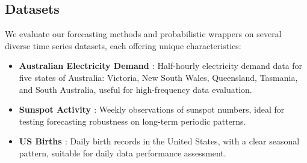 \subsection{Datasets} \label{datasets}
We evaluate our forecasting methods and probabilistic wrappers on several diverse time series datasets, each offering unique characteristics:

\begin{itemize}
    \item \textbf{Australian Electricity Demand \cite{Godahewa2021Australian}}: Half-hourly electricity demand data for five states of Australia: Victoria, New South Wales, Queensland, Tasmania, and South Australia, useful for high-frequency data evaluation.
    \item \textbf{Sunspot Activity \cite{Godahewa2021Sunspot}}: Weekly observations of sunspot numbers, ideal for testing forecasting robustness on long-term periodic patterns.
    \item \textbf{US Births \cite{Godahewa2021USBirth}}: Daily birth records in the United States, with a clear seasonal pattern, suitable for daily data performance assessment.
\end{itemize}



